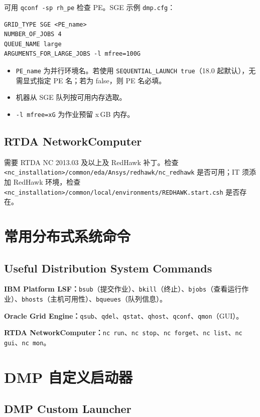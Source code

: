 可用 \texttt{qconf -sp rh\_pe} 检查 PE。SGE 示例 \texttt{dmp.cfg}：
\begin{lstlisting}
GRID_TYPE SGE <PE_name>
NUMBER_OF_JOBS 4
QUEUE_NAME large
ARGUMENTS_FOR_LARGE_JOBS -l mfree=100G
\end{lstlisting}

\begin{itemize}
  \item \texttt{PE\_name} 为并行环境名。若使用 \texttt{SEQUENTIAL\_LAUNCH true}（18.0 起默认），无需显式指定 PE 名；若为 false，则 PE 名必填。
  \item 机器从 SGE 队列按可用内存选取。
  \item \texttt{-l mfree=xG} 为作业预留 x\,GB 内存。
\end{itemize}

\subsection{RTDA NetworkComputer}
需要 RTDA NC 2013.03 及以上及 RedHawk 补丁。检查 \texttt{<nc\_installation>/common/eda/Ansys/redhawk/nc\_redhawk} 是否可用；IT 须添加 RedHawk 环境，检查 \texttt{<nc\_installation>/common/local/environments/REDHAWK.start.csh} 是否存在。

\section{常用分布式系统命令}
\subsection*{Useful Distribution System Commands}

\textbf{IBM Platform LSF：}\texttt{bsub}（提交作业）、\texttt{bkill}（终止）、\texttt{bjobs}（查看运行作业）、\texttt{bhosts}（主机可用性）、\texttt{bqueues}（队列信息）。

\textbf{Oracle Grid Engine：}\texttt{qsub}、\texttt{qdel}、\texttt{qstat}、\texttt{qhost}、\texttt{qconf}、\texttt{qmon}（GUI）。

\textbf{RTDA NetworkComputer：}\texttt{nc run}、\texttt{nc stop}、\texttt{nc forget}、\texttt{nc list}、\texttt{nc gui}、\texttt{nc mon}。

\section{DMP 自定义启动器}
\subsection*{DMP Custom Launcher}

